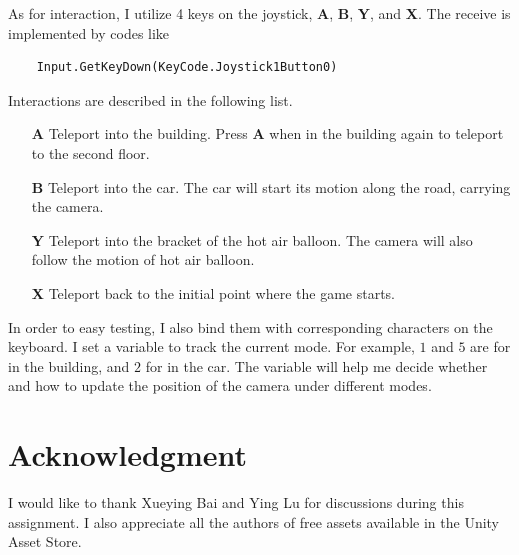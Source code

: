 \documentclass[11pt]{article}
\begin{document}
	As for interaction, I utilize 4 keys on the joystick, \textbf{A}, \textbf{B}, \textbf{Y}, and \textbf{X}. The receive is implemented by codes like
	\begin{lstlisting}
	Input.GetKeyDown(KeyCode.Joystick1Button0)\end{lstlisting}
	Interactions are described in the following list.
	\begin{itemize}
		\item[\textbf{A}] Teleport into the building. Press \textbf{A} when in the building again to teleport to the second floor.
		\item[\textbf{B}] Teleport into the car. The car will start its motion along the road, carrying the camera.
		\item[\textbf{Y}] Teleport into the bracket of the hot air balloon. The camera will also follow the motion of hot air balloon.
		\item[\textbf{X}] Teleport back to the initial point where the game starts.
	\end{itemize}
	In order to easy testing, I also bind them with corresponding characters on the keyboard.
	I set a variable to track the current mode. For example, $1$ and $5$ are for in the building, and $2$ for in the car. The variable will help me decide whether and how to update the position of the camera under different modes.
	
	\section{Acknowledgment}
	I would like to thank Xueying Bai and Ying Lu for discussions during this assignment. I also appreciate all the authors of free assets available in the Unity Asset Store.
	
	
\end{document}
